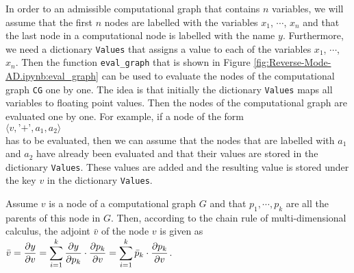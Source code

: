 In order to  an admissible computational graph that contains $n$ variables, we will assume that the first
$n$ nodes are labelled with the variables $x_1$, $\cdots$, $x_n$ and that the last node in a computational node
is labelled with the name $y$.  Furthermore, we need a dictionary \texttt{Values} that assigns a value to each
of the variables $x_1$, $\cdots$, $x_n$.  Then the function \texttt{eval\_graph} that is shown in Figure
\ref{fig:Reverse-Mode-AD.ipynb:eval_graph} can be used to evaluate the nodes of the computational graph
\texttt{CG} one by one.  The idea is that initially the dictionary \texttt{Values} maps all variables to
floating point values.  Then the nodes of the computational graph are evaluated one by one.  For example, if a
node of the form
\\[0.2cm]
\hspace*{1.3cm}
$\langle v, \texttt{'+'}, a_1, a_2 \rangle$
\\[0.2cm]
has to be evaluated, then we can assume that the nodes that are labelled with $a_1$ and $a_2$ have already been
evaluated and that their values are stored in the dictionary \texttt{Values}.  These values are added and the
resulting value is stored under the key $v$ in the dictionary \texttt{Values}.

Assume $v$ is a node of a computational graph $G$ and that $p_1, \cdots, p_k$ are all the parents of this node
in $G$. Then, according to the chain rule of multi-dimensional calculus,  the adjoint $\bar{v}$ of the node $v$
is given as
\\[0.2cm]
\hspace*{1.3cm}
$\displaystyle\bar{v} = \frac{\partial y}{\partial v} 
            = \sum\limits_{i=1}^k \frac{\partial y}{\partial p_k} \cdot \frac{\partial p_k}{\partial v}
            = \sum\limits_{i=1}^k \bar{p}_k \cdot \frac{\partial p_k}{\partial v}
$.
\\[0.2cm]


